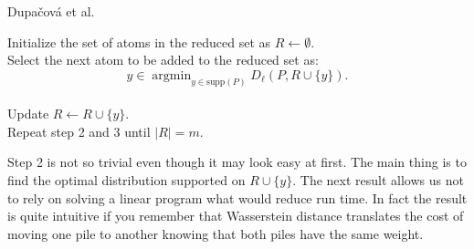 \documentclass{amsart}
\newcommand{\argmin}{\mathop{\arg\min}}
\begin{document}
\begin{algorithm}
  \caption{Dupačová et al.}\label{dupacova}
  Initialize the set of atoms in the reduced set as $R\gets \emptyset.$ \\ Select the next atom to be added to the reduced set as: $$ y\in\argmin_{y\in \text{supp}\left(P\right)}D_\ell\left(P,R\cup\{y\}\right).
  $$ \\
  Update $R\gets R\cup \{y\}$.\\ Repeat step 2 and 3 until $\lvert R\rvert=m$.
\end{algorithm}

Step 2 is not so trivial even though it may look easy at first. The main thing is to find the optimal distribution supported on $R\cup\{y\}$. The next result allows us not to rely on solving a linear program what would reduce run time. In fact the result is quite intuitive if you remember that Wasserstein distance translates the cost of moving one pile to another knowing that both piles have the same weight.
\end{document}
